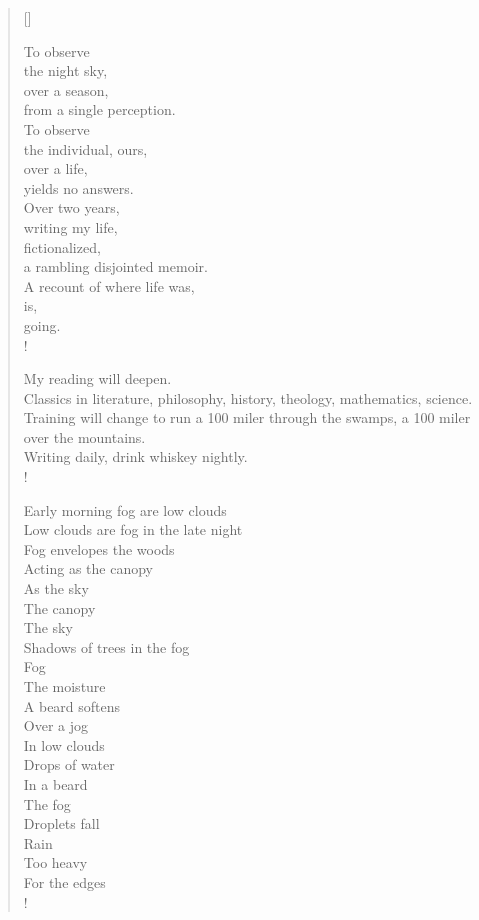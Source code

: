 \documentclass[11pt, a4paper]{article}
\begin{document}
\begin{verse}[\versewidth]

To observe \\
the night sky, \\
over a season, \\
from a single perception. \\

To observe \\
the individual, 
ours, \\
over a life, \\
yields no answers. \\


Over two years, \\
writing my life, \\
fictionalized, \\
a rambling disjointed memoir. \\
A recount of where life was, \\
is, \\
going. \\!


My reading will deepen. \\ 
Classics in literature, philosophy, history, theology, mathematics, science. \\
Training will change to run a 100 miler through the swamps, a 100 miler over the mountains. \\
Writing daily, drink whiskey nightly. \\!


Early morning fog are low clouds \\
Low clouds are fog in the late night \\
Fog envelopes the woods \\
Acting as the canopy \\
As the sky \\
The canopy \\
The sky \\
Shadows of trees in the fog \\
Fog \\
The moisture \\
A beard softens \\
Over a jog \\
In low clouds \\
Drops of water \\
In a beard \\
The fog \\
Droplets fall \\
Rain \\
Too heavy \\ 
For the edges \\!


\end{verse}
\end{document}
